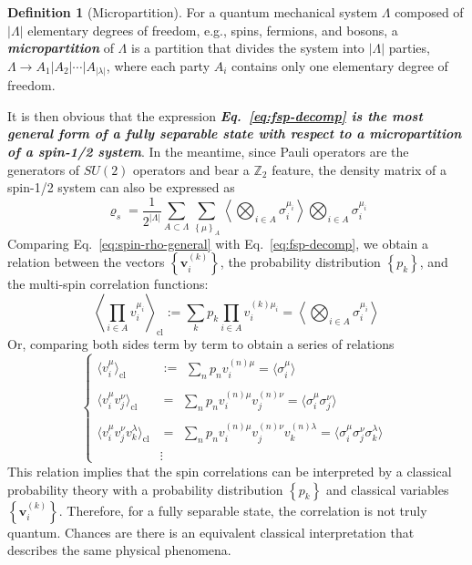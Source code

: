 \documentclass[12font]{article}
\numberwithin{equation}{section}    %
\theoremstyle{definition}
\newtheorem{definition}{Definition}[section]
\newcommand{\anglelr}[1]{\langle #1 \rangle}
\newcommand{\Anglelr}[1]{\left\langle #1 \right\rangle}
\newcommand{\lrg}[1]{\left\{  #1  \right\}}
\newcommand{\abs}[1]{\left|  #1  \right|}
\newcommand{\mrm}[1]{\mathrm{#1}}
\newcommand{\bo}[1]{\mathbf{#1}}
\newcommand{\arrequ}[1]{\begin{aligned}#1\end{aligned}}
\begin{document}
\begin{definition}[Micropartition]
    For a quantum mechanical system $\Lambda$ composed of $\abs{\Lambda}$ elementary degrees of freedom, e.g., spins, fermions, and bosons, a \textit{\textbf{micropartition}} of $\Lambda$ is a partition that divides the system into $\abs{\Lambda}$ parties, $\Lambda\to A_1|A_2|\cdots|A_{\abs{\lambda}}$, where each party $A_i$ contains only one elementary degree of freedom.
\end{definition}
It is then obvious that the expression \textbf{\textit{Eq.~\eqref{eq:fsp-decomp} is the most general form of a fully separable state with respect to a micropartition of a spin-1/2 system}}. In the meantime, since Pauli operators are the generators of $SU(2)$ operators and bear a $\mathbb{Z}_2$ feature, the density matrix of a spin-1/2 system can also be expressed as
\begin{equation}\label{eq:spin-rho-general}
    \varrho_s = \frac{1}{2^{\abs{\Lambda}}}
    \sum_{A\subset \Lambda} 
    \sum_{\lrg{\mu}_A} 
    \Anglelr{\bigotimes_{i\in A}\sigma^{\mu_i}_i}
    \bigotimes_{i\in A}\sigma^{\mu_i}_i
\end{equation}
Comparing Eq.~\eqref{eq:spin-rho-general} with Eq.~\eqref{eq:fsp-decomp}, we obtain a relation between the vectors $\lrg{\bo{v}^{(k)}_i}$, the probability distribution $\lrg{p_k}$, and the multi-spin correlation functions:
\begin{equation}\label{eq:fsp-hierarch-general}
    \Anglelr{\prod_{i\in A} v^{\mu_i}_i}_{\mrm{cl}}
    :=
    \sum_{k} p_k
    \prod_{i\in A} v^{(k)\mu_i}_i
    =
    \Anglelr{\bigotimes_{i\in A}\sigma^{\mu_i}_i}
\end{equation}
Or, comparing both sides term by term to obtain a series of relations
\begin{equation}\label{eq:fsp-hierarchy}
\left\{
    \begin{aligned}
        \anglelr{v^{\mu}_i}_{\mrm{cl}} &:= \arrequ{\sum_{n}p_n v^{(n)\mu}_i = \anglelr{\sigma_i^{\mu}}} \\
        \anglelr{v^{\mu}_i v^{\nu}_j}_{\mrm{cl}}  
        &= \arrequ{\sum_{n}p_n v^{(n)\mu}_i v^{(n)\nu}_j = \anglelr{\sigma_i^{\mu}\sigma^{\nu}_j} } \\
        \anglelr{v^{\mu}_i v^{\nu}_j v^{\lambda}_k}_{\mrm{cl}} 
        &= \arrequ{\sum_{n}p_n v^{(n)\mu}_i v^{(n)\nu}_j v^{(n)\lambda}_k = \anglelr{\sigma_i^{\mu}\sigma^{\nu}_j\sigma^{\lambda}_k} } \\
        &\vdots
    \end{aligned}
\right.
\end{equation}
This relation implies that the spin correlations can be interpreted by a classical probability theory with a probability distribution $\lrg{p_k}$ and classical variables $\lrg{\bo{v}^{(k)}_i}$. Therefore, for a fully separable state, the correlation is not truly quantum. Chances are there is an equivalent classical interpretation that describes the same physical phenomena.
\end{document}
